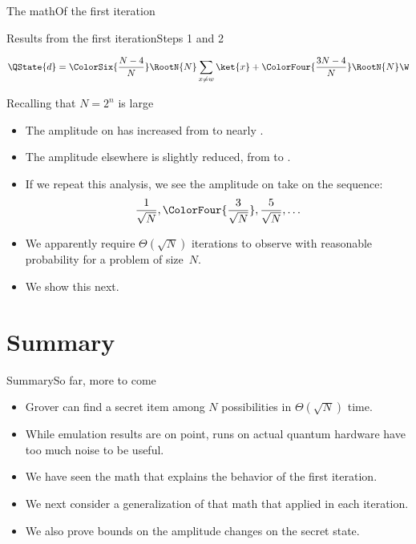 \begin{Grover}
\begin{frame}{The math}{Of the first iteration}
{ 
}
    
\end{frame}
\begin{frame}{Results from the first iteration}{Steps 1 and 2}

\Vskip{-3em}\[
\QState{d}  = \ColorSix{\frac{N-4}{N}}\RootN{N}\sum_{x\neq w} \ket{x} + \ColorFour{\frac{3N-4}{N}}\RootN{N}\W \]

Recalling that $N=2^{n}$ is large
\begin{itemize}
    \item The amplitude on \W{} has increased from  to nearly .
    \item The amplitude elsewhere is slightly reduced, from  to .
    \item If we repeat this analysis, we see the amplitude on \W{} take on the sequence:
    \[ \frac{1}{\sqrt{N}}, \ColorFour{\frac{3}{\sqrt{N}}}, \frac{5}{\sqrt{N}}, \ldots
    \]
    \item We apparently require $\Theta(\sqrt{N})$ iterations to observe \W{} with reasonable probability for a problem of size~$N$.
    \item We show this next.
\end{itemize}
    
\end{frame}
\end{Grover}
\section*{Summary}
\begin{frame}{Summary}{So far, more to come}
\begin{itemize}
    \item Grover can find a secret item among $N$ possibilities in $\Theta(\sqrt{N})$ time.
    \item While emulation results are on point, runs on actual quantum hardware have too much noise to be useful.
    \item We have seen the math that explains the behavior of the first iteration.
    \item We next consider a generalization of that math that applied in each iteration.
    \item We also prove bounds on the amplitude changes on the secret state.
\end{itemize}
\end{frame}